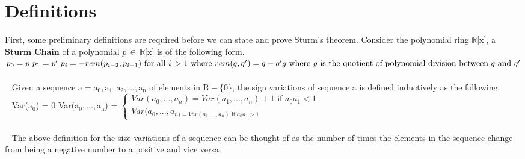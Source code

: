 \documentclass[a4paper]{article}
\begin{document}
\section{Definitions}
First, some preliminary definitions are required before we can state and prove Sturm's theorem.
Consider the polynomial ring $\mathbb{R}$[x], a $\mathbf{Sturm\,\,Chain}$ of a polynomial $p \,\in\, \mathbb{R}$[x] is of the following form. \newline
\begin{math}
    p_0 = p \\~
    p_1 = p^{\prime} \\~
    p_i = -rem(p_{i-2}, p_{i-1}) \text{ for all } i \, > 1 \text{ where } rem(q, q^{\prime}) =  q - q^{\prime}g \\~ \text{where } g \text{ is the quotient of polynomial division between } q \text{ and } q^{\prime} 
\end{math}
\\~
\\~
Given a sequence $\mathrm{a = a_{0}, a_{1}, a_{2}, ... , a_{n}}$ of elements in $\mathrm{R - \{0\}}$, the sign variations of sequence a is defined inductively as the following:
\newline
\\~
Var($\mathrm{a_{0}}$) = 0 \newline
Var($\mathrm{a_{0},...,a_{n}}$) = 
\begin{math}
\begin{cases}
  Var(a_{0},...,a_{n}) = Var({a_{1},...,a_{n}}) + 1 \text{ if } a_{0}a_{1} < 1 \\
  Var(a_{0},...,a_{n) = Var(a_{1},...,a_{n}) \text{ if } a_{0}a_{1} > 1}
\end{cases}
\end{math}
\\~
\\~
The above definition for the size variations of a sequence can be thought of as the number of times the elements in the sequence change from being a negative number to a positive and vice versa.
\end{document}
